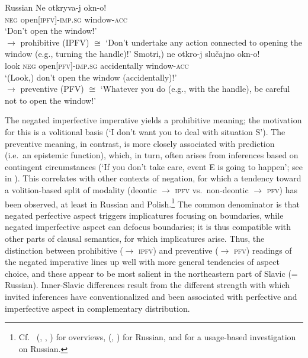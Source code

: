 \documentclass[output=paper,colorlinks,citecolor=brown]{langscibook}
\begin{document}
\ea \textnormal{Russian}
\label{ex:wiemer45} 
\ea \label{ex:wiemer45a}
\gll Ne otkryva-j okn-o! \\
\textsc{neg} open\textsc{[ipfv]-imp.sg} window-\textsc{acc} \\
\glt `Don't open the window!' \\
$\rightarrow$ prohibitive (IPFV) ${\cong}$ `Don't undertake any action connected to opening the window (e.g., turning the handle)!'
\ex \label{ex:wiemer45b}
\gll {\op}Smotri\textnormal{,)} ne otkro-j {\op}slučajno{\cp} okn-o! \\
look \textsc{neg} open\textsc{[pfv]-imp.sg} accidentally window-\textsc{acc} \\
\glt `(Look,) don't open the window (accidentally)!' \\
$\rightarrow$ preventive (PFV) ${\cong}$ `Whatever you do (e.g., with the handle), be careful not to open the window!'
\z
\z


\noindent The negated imperfective imperative yields a prohibitive meaning; the motivation for this is a volitional basis (`I don't want you to deal with situation S'). The preventive meaning, in contrast, is more closely associated with prediction (i.e.\ an epistemic function), which, in turn, often arises from inferences based on contingent circumstances (`If you don't take care, event E is going to happen'; see  in ). This correlates with other contexts of negation, for which a tendency toward a volition-based split of modality (deontic ${\rightarrow}$ \textsc{ipfv} vs.\ non-deontic ${\rightarrow}$ \textsc{pfv}) has been observed, at least in Russian and Polish.\footnote{Cf.\ \citeauthor{Wiemer2001} (\citeyear{Wiemer2001}, \citeyear[403--405]{Wiemer2008}, \citeyear[281--285]{Wiemer2017}) for overviews, \citeauthor{Padučeva2008} (\citeyear{Padučeva2008}, \citeyear[211--218]{Padučeva2013}) for Russian, and \citet{Divjak2009} for a usage-based investigation on Russian.} The common denominator is that negated perfective aspect triggers implicatures focusing on boundaries, while negated imperfective aspect can defocus boundaries; it is thus compatible with other parts of clausal semantics, for which implicatures arise. Thus, the distinction between prohibitive (${\rightarrow}$ \textsc{ipfv}) and preventive (${\rightarrow}$ \textsc{pfv}) readings of the negated imperative lines up well with more general tendencies of aspect choice, and these appear to be most salient in the northeastern part of Slavic (= Russian). Inner-Slavic differences result from the different strength with which invited inferences have conventionalized and been associated with perfective and imperfective aspect in complementary distribution.
\end{document}
